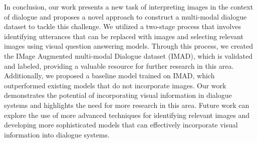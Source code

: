 
In conclusion, our work presents a new task of interpreting images in the context of dialogue and proposes a novel approach to construct a multi-modal dialogue dataset to tackle this challenge. We utilized a two-stage process that involves identifying utterances that can be replaced with images and selecting relevant images using visual question answering models. Through this process, we created the IMage Augmented multi-modal Dialogue dataset (IMAD), which is validated and labeled, providing a valuable resource for further research in this area. Additionally, we proposed a baseline model trained on IMAD, which outperformed existing models that do not incorporate images. Our work demonstrates the potential of incorporating visual information in dialogue systems and highlights the need for more research in this area. Future work can explore the use of more advanced techniques for identifying relevant images and developing more sophisticated models that can effectively incorporate visual information into dialogue systems.
